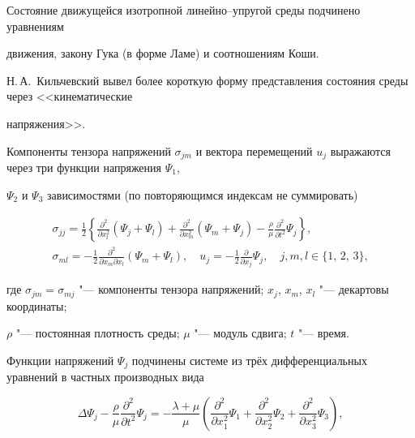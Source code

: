  Состояние движущейся изотропной линейно--упругой среды подчинено уравнениям

движения, закону Гука (в форме Ламе) и соотношениям Коши.

Н.\,А.~Кильчевский \cite{penkov:KNA} вывел более короткую форму представления состояния среды через <<кинематические

напряжения>>.



Компоненты тензора напряжений $\sigma _{jm}$ и вектора перемещений $u _{j}$ выражаются через три функции напряжения  $\Psi _{1}$,

$\Psi _{2}$ и $\Psi _{3}$ зависимостями (по повторяющимся индексам не суммировать)

\begin{gather*}

\sigma _{jj} =\frac{1}{2} \left\{ \frac{\partial ^{2} }{\partial x_{l}^2 } \left( \Psi _{j} +\Psi _{l} \right)

+\frac{\partial ^{2} }{\partial x_{m}^2 } \left( \Psi _{m} +\Psi _{j} \right) -\frac{\rho }{\mu } \frac{\partial ^{2}

 }{\partial t^{2} } \Psi _{j} \right\},\\

\sigma _{ml} =-\frac{1}{2} \frac{\partial ^{2} }{\partial x_{m} \partial x_{l} }\left( \Psi _{m} +\Psi _{l} \right) ,\quad u_{j}

=-\frac{1}{2} \frac{\partial }{\partial x_{j} } \Psi _{j} , \quad j, m, l \in \{1,\,2,\,3\},

\end{gather*}

где $\sigma _{jm} = \sigma _{mj}$ "--- компоненты тензора напряжений; $x _{j}$, $x _{m}$, $x _{l}$ "--- декартовы координаты;

$\rho$ "--- постоянная плотность среды; $\mu$ "--- модуль сдвига; $t$ "--- время.



Функции напряжений $\Psi _{j}$ подчинены системе из трёх дифференциальных уравнений в частных производных вида

\begin{equation}

\label{penkov:Equation_1} \Delta \Psi_{j} -\frac{\rho }{\mu } \frac{\partial ^{2} }{\partial t^{2} } \Psi _{j}  =-\frac{\lambda

+\mu }{\mu } \left( \frac{\partial ^{2} }{\partial x _{1}^{2} } \Psi _{1}  +\frac{\partial ^{2} }{\partial x _{2}^{2} } \Psi _{2} 

+\frac{\partial ^{2}  }{\partial x _{3}^{2} } \Psi _{3}\right),

\end{equation}

